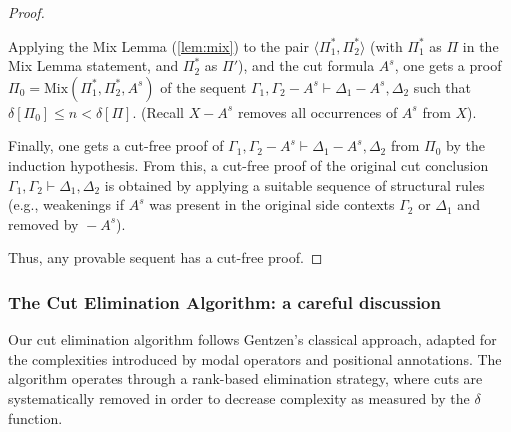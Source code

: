 \documentclass{article}
\newcommand{\seq}[2]{{#1} \vdash{} {#2}}
\newcommand{\pf}[2]{{#1}^{#2}} %
\newcommand{\cana}[1]{#1\!-\!\pf{A}{s}}
\theoremstyle{definition}
\begin{document}
\begin{proof}
\begin{enumerate}
        Applying the Mix Lemma (\ref{lem:mix}) to the pair $\langle \Pi_1^*, \Pi_2^* \rangle$ (with $\Pi_1^*$ as $\Pi$ in the Mix Lemma statement, and $\Pi_2^*$ as $\Pi'$),
        and the cut formula $\pf{A}{s}$, one gets a proof $\Pi_0 = \text{Mix}(\Pi_1^*, \Pi_2^*, \pf{A}{s})$
        of the sequent $\seq{\Gamma_1, \cana{\Gamma_2}}{\cana{\Delta_1}, \Delta_2}$ such that
        $\delta[\Pi_0] \le n < \delta[\Pi]$. (Recall $\cana{X}$ removes all occurrences of $\pf{A}{s}$ from $X$).

        Finally, one gets a cut-free proof of
        $\seq{\Gamma_1, \cana{\Gamma_2}}{\cana{\Delta_1}, \Delta_2}$ from $\Pi_0$ by the induction hypothesis.
        From this, a cut-free proof of the original cut conclusion $\seq{\Gamma_1, \Gamma_2}{\Delta_1, \Delta_2}$
        is obtained by applying a suitable sequence of structural rules (e.g., weakenings if $\pf{A}{s}$ was present in the original side contexts $\Gamma_2$ or $\Delta_1$ and removed by $\cana{}$).
\end{enumerate}
Thus, any provable sequent has a cut-free proof.

\end{proof}


\subsubsection{The Cut Elimination Algorithm: a careful discussion}\label{ssec:implementation}

Our cut elimination algorithm follows Gentzen's classical approach, adapted for the complexities introduced by modal operators and positional annotations. The algorithm operates through a rank-based elimination strategy, where cuts are systematically removed in order to decrease complexity as measured by the $\delta$ function.
\end{document}
